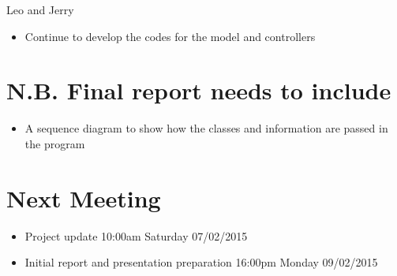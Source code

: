 \documentclass{article}
\begin{document}
\noindent
Leo and Jerry
\begin{itemize}
\item Continue to develop the codes for the model and controllers
\end{itemize}


\section {N.B. Final report needs to include}
\begin{itemize}
\item A sequence diagram to show how the classes and information are passed in the program 
\end{itemize}


\section {Next Meeting}
\begin{itemize}
\item Project update 10:00am Saturday 07/02/2015
\item Initial report and presentation preparation 16:00pm Monday 09/02/2015
\end{itemize}
\end{document}
